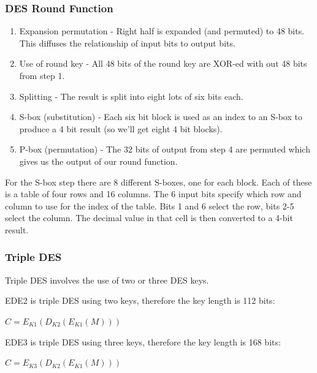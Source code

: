 \documentclass{article}
\begin{document}
\subsubsection{DES Round Function}
\begin{enumerate}
	\item Expansion permutation - Right half is expanded (and permuted) to 48 bits. This diffuses the relationship of input bits to output bits.
	\item Use of round key - All 48 bits of the round key are XOR-ed with out 48 bits from step 1.
	\item Splitting - The result is split into eight lots of six bits each.
	\item S-box (substitution) - Each six bit block is used as an index to an S-box to produce a 4 bit result (so we'll get eight 4 bit blocks).
	\item P-box (permutation) - The 32 bits of output from step 4 are permuted which gives us the output of our round function.
\end{enumerate}
For the S-box step there are 8 different S-boxes, one for each block. Each of these is a table of four rows and 16 columns. The 6 input bits specify which row and column to use for the index of the table. Bits 1 and 6 select the row, bits 2-5 select the column. The decimal value in that cell is then converted to a 4-bit result.

\subsubsection{Triple DES}
Triple DES involves the use of two or three DES keys.

EDE2 is triple DES using two keys, therefore the key length is 112 bits:
\begin{center}
	$C=E_{K1}(D_{K2}(E_{K1}(M)))$
\end{center}
EDE3 is triple DES using three keys, therefore the key length is 168 bits:
\begin{center}
	$C=E_{K3}(D_{K2}(E_{K1}(M)))$
\end{center}
\end{document}
